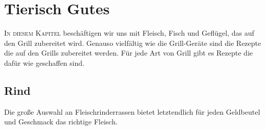 
\chapter{Tierisch Gutes}\label{Chapter2}
\lettrine[lines=3]{I}{n diesem Kapitel} beschäftigen wir uns mit Fleisch, Fisch 
und Geflügel, das auf den Grill zubereitet wird.  
Genauso vielfältig wie die Grill-Geräte sind die Rezepte die auf den Grills 
zubereitet werden. Für jede Art von Grill gibt es 
Rezepte die dafür wie geschaffen sind.

\section{Rind}

Die große Auswahl an Fleischrinderrassen bietet letztendlich für jeden 
Geldbeutel und Geschmack das richtige Fleisch. 

